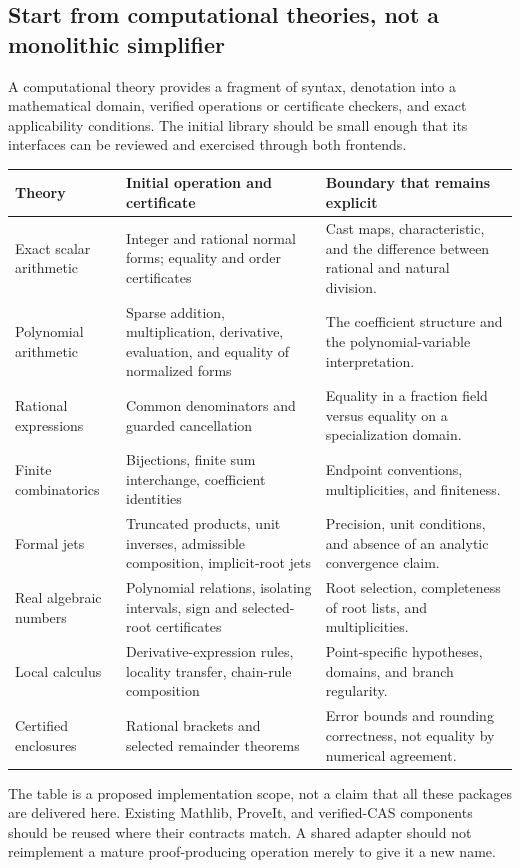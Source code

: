 \documentclass[11pt,letterpaper]{article}
\theoremstyle{definition}
\theoremstyle{remark}
\begin{document}
\subsection{Start from computational theories, not a monolithic simplifier}
A computational theory provides a fragment of syntax, denotation into a
mathematical domain, verified operations or certificate checkers, and exact
applicability conditions. The initial library should be small enough that its
interfaces can be reviewed and exercised through both frontends.

\begin{longtable}{@{}P{.22\textwidth}P{.39\textwidth}P{.31\textwidth}@{}}
\toprule
Theory & Initial operation and certificate & Boundary that remains explicit\\
\midrule
\endhead
Exact scalar arithmetic & Integer and rational normal forms; equality and
order certificates & Cast maps, characteristic, and the difference between
rational and natural division.\\
Polynomial arithmetic & Sparse addition, multiplication, derivative, evaluation,
and equality of normalized forms & The coefficient structure and the
polynomial-variable interpretation.\\
Rational expressions & Common denominators and guarded cancellation & Equality
in a fraction field versus equality on a specialization domain.\\
Finite combinatorics & Bijections, finite sum interchange, coefficient identities &
Endpoint conventions, multiplicities, and finiteness.\\
Formal jets & Truncated products, unit inverses, admissible composition,
implicit-root jets & Precision, unit conditions, and absence of an analytic
convergence claim.\\
Real algebraic numbers & Polynomial relations, isolating intervals, sign and
selected-root certificates & Root selection, completeness of root lists,
and multiplicities.\\
Local calculus & Derivative-expression rules, locality transfer, chain-rule
composition & Point-specific hypotheses, domains, and branch regularity.\\
Certified enclosures & Rational brackets and selected remainder theorems &
Error bounds and rounding correctness, not equality by numerical agreement.\\
\bottomrule
\end{longtable}
The table is a proposed implementation scope, not a claim that all these
packages are delivered here. Existing Mathlib, ProveIt, and verified-CAS
components should be reused where their contracts match. A shared adapter
should not reimplement a mature proof-producing operation merely to give it
a new name.
\end{document}
